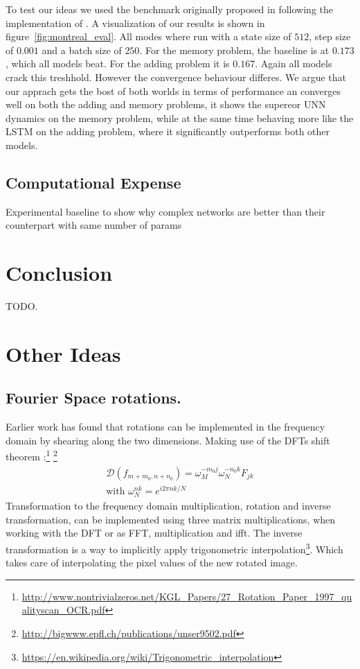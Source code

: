 \documentclass{article}
\begin{document}
To test our ideas we used the benchmark originally proposed in \cite{Hochreiter} following the implementation of \cite{Arjovsky}. A visualization of our results is shown in figure~\ref{fig:montreal_eval}. All modes where run with a state size of $512$, step size of $0.001$ and a batch size of $250$. For the memory problem, the baseline is at $0.173$, which all models beat. For the adding problem it is $0.167$. Again all models crack this treshhold. However the convergence behaviour differes. We argue that our apprach gets the bost of both worlds in terms of performance an converges well on both the adding and memory problems, it shows the supereor UNN dynamics on the memory problem, while at the same time behaving more like the LSTM on the adding problem, where it significantly outperforms both other models.


\subsection{Computational Expense}
Experimental baseline to show why complex networks are better than their counterpart with same number of params

\section{Conclusion}
TODO.



\section{Other Ideas}
\subsection{Fourier Space rotations.}
Earlier work has found that rotations can be implemented in the frequency domain by shearing along 
the two dimensions. Making use of the DFTs shift theorem \cite[page 173]{Briggs}:\footnote{\url{http://www.nontrivialzeros.net/KGL_Papers/27_Rotation_Paper_1997_qualityscan_OCR.pdf}}
\footnote{\url{http://bigwww.epfl.ch/publications/unser9502.pdf}}
\begin{align}
\mathcal{D}(f_{m + m_0, n + n_0}) = \omega_M^{-m_0j}\omega_N^{-n_0k}F_{jk} \\
\text{with } \omega_N^{nk} = e^{i2\pi nk/N}
\end{align}
Transformation to the frequency domain multiplication, rotation and inverse transformation, can be implemented using three matrix multiplications, when working with the DFT or as FFT, multiplication and ifft. The inverse transformation is a way to implicitly apply trigonometric interpolation\footnote{\url{https://en.wikipedia.org/wiki/Trigonometric_interpolation}}. Which takes care of interpolating the pixel values of the new rotated image.
\end{document}
